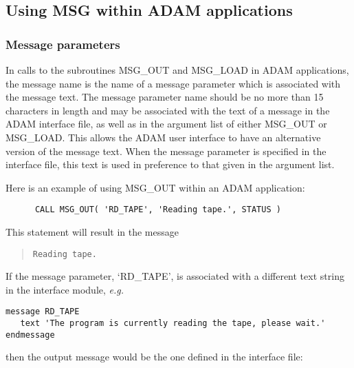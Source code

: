 \subsection {Using MSG within ADAM applications} \label{adam_msg}

\subsubsection {Message parameters}

In calls to the subroutines MSG\_OUT and MSG\_LOAD in ADAM applications, the
message name is the name of a message parameter which is associated with the
message text.
The message parameter name should be no more than 15 characters in length and 
may be associated with the text of a message in the ADAM interface file, as 
well as in the argument list of either MSG\_OUT or MSG\_LOAD.
This allows the ADAM user interface to have an alternative version of the
message text. 
When the message parameter is specified in the interface file, 
this text is used in preference to that given in the argument list.

Here is an example of using MSG\_OUT within an ADAM application:

\begin {small}
\begin{verbatim}
      CALL MSG_OUT( 'RD_TAPE', 'Reading tape.', STATUS )
\end{verbatim}
\end {small}

This statement will result in the message 

\begin {quote}
\begin {small}
\begin{verbatim}
Reading tape.
\end{verbatim}
\end {small}
\end {quote}

If the message parameter, `RD\_TAPE', is associated with a  different text
string in the interface module, {\em e.g.}

\begin {small}
\begin{verbatim}
message RD_TAPE
   text 'The program is currently reading the tape, please wait.'
endmessage
\end{verbatim}
\end {small}

then the output message would be the one defined in the interface file:

